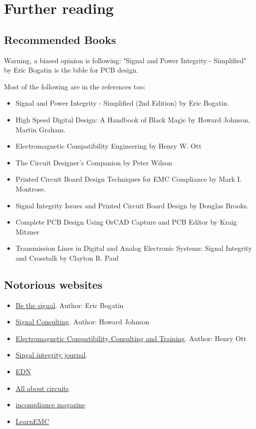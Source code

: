 \documentclass[final]{cubedoc}
\begin{document}
	
	\section{Further reading}
	\subsection{Recommended Books}
	
	Warning, a biased opinion is following: "Signal and Power Integrity - Simplified" by Eric Bogatin is the bible for PCB design.
	
	Most of the following are in the references too:
	\begin{itemize}
		\item Signal and Power Integrity - Simplified (2nd Edition) by Eric Bogatin.
		\item High Speed Digital Design: A Handbook of Black Magic by Howard Johnson, Martin Graham.
		\item Electromagnetic Compatibility Engineering by Henry W. Ott
		\item The Circuit Designer's Companion by Peter Wilson
		\item Printed Circuit Board Design Techniques for EMC Compliance by Mark I. Montrose.
		\item Signal Integrity Issues and Printed Circuit Board Design by Douglas Brooks.
		\item Complete PCB Design Using OrCAD Capture and PCB Editor by Kraig Mitzner
		\item Transmission Lines in Digital and Analog Electronic Systems: Signal Integrity and Crosstalk by Clayton R. Paul
	\end{itemize}
	
	\subsection{Notorious websites}
	\begin{itemize}
		\item \href{https://bethesignal.com/bogatin/}{Be the signal}. Author: Eric Bogatin
		\item \href{http://www.sigcon.com/}{Signal Consulting}. Author: Howard Johnson
		\item \href{http://www.hottconsultants.com/}{Electromagnetic Compatibility Consulting and Training}. Author: Henry Ott
		\item \href{https://www.signalintegrityjournal.com/}{Singal integrity journal}. 
		\item \href{https://www.edn.com/}{EDN}
		\item \href{https://www.allaboutcircuits.com/}{Αll about circuits}
		\item \href{https://incompliancemag.com/topics/resources/}{incompliance magazine}
		\item \href{https://learnemc.com/}{LearnEMC}
	\end{itemize}
	
	
	
	
	
	
\end{document}
